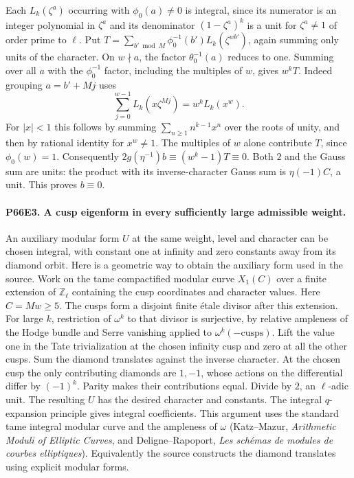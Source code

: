Each $L_k(\zeta^a)$ occurring with $\phi_0(a)\ne0$ is integral,
since its numerator is an integer polynomial in $\zeta^a$ and its
denominator $(1-\zeta^a)^k$ is a unit for $\zeta^a\ne1$ of
order prime to $\ell$. Put
$T=\sum_{b'\bmod M}\phi_0^{-1}(b')L_k(\zeta^{wb'})$,
again summing only units of the character. On $w\nmid a$, the
factor $\theta_0^{-1}(a)$ reduces to one. Summing over all $a$
with the $\phi_0^{-1}$ factor, including the multiples of $w$,
gives $w^kT$. Indeed grouping $a=b'+Mj$ uses
\[
 \sum_{j=0}^{w-1}L_k(x\zeta^{Mj})=w^k L_k(x^w).
\]
For $|x|<1$ this follows by summing $\sum_{n\ge1}n^{k-1}x^n$
over the roots of unity, and then by rational identity for $x^w\ne1$.
The multiples of $w$ alone contribute $T$, since $\phi_0(w)=1$.
Consequently $2g(\eta^{-1})b\equiv(w^k-1)T\equiv0$.
Both $2$ and the Gauss sum are units: the product with its inverse-character
Gauss sum is $\eta(-1)C$, a unit. This proves $b\equiv0$.

\paragraph{P66E3. A cusp eigenform in every sufficiently large admissible weight.}
An auxiliary modular form $U$ at the same weight, level and character
can be chosen integral, with constant one at infinity and zero
constants away from its diamond orbit. Here is a geometric way to
obtain the auxiliary form used in the source. Work on the tame
compactified modular curve $X_1(C)$ over a finite extension of
$\mathbb Z_\ell$ containing the cusp coordinates and character
values. Here $C=Mw\ge5$. The cusps form a disjoint finite
\'etale divisor after this extension. For large $k$, restriction
of $\omega^k$ to that divisor is surjective, by relative ampleness
of the Hodge bundle and Serre vanishing applied to
$\omega^k(-\mathrm{cusps})$. Lift the value one in the Tate
trivialization at the chosen infinity cusp and zero at all the
other cusps. Sum the diamond translates against the inverse
character. At the chosen cusp the only contributing diamonds are
$1,-1$, whose actions on the differential differ by $(-1)^k$.
Parity makes their contributions equal. Divide by $2$, an
$\ell$-adic unit. The resulting $U$ has the desired character
and constants. The integral $q$-expansion principle gives integral
coefficients. This argument uses the standard tame integral modular
curve and the ampleness of $\omega$ (Katz--Mazur,
\emph{Arithmetic Moduli of Elliptic Curves}, and
Deligne--Rapoport, \emph{Les sch\'emas de modules de courbes
elliptiques}). Equivalently the source constructs the diamond
translates using explicit modular forms.

